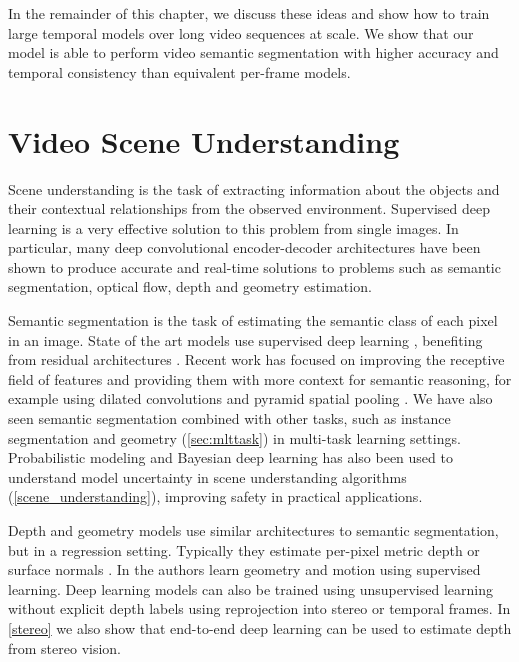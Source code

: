 In the remainder of this chapter, we discuss these ideas and show how to train large temporal models over long video sequences at scale. We show that our model is able to perform video semantic segmentation with higher accuracy and temporal consistency than equivalent per-frame models.



\section{Video Scene Understanding} 

Scene understanding is the task of extracting information about the objects and their contextual relationships from the observed environment. Supervised deep learning is a very effective solution to this problem from single images. In particular, many deep convolutional encoder-decoder architectures have been shown to produce accurate and real-time solutions to problems such as semantic segmentation, optical flow, depth and geometry estimation.

Semantic segmentation is the task of estimating the semantic class of each pixel in an image. State of the art models use supervised deep learning \citep{badrinarayanan2017segnet,long2015fully}, benefiting from residual architectures \citep{he2016deep,huang2017densely}. Recent work has focused on improving the receptive field of features and providing them with more context for semantic reasoning, for example using dilated convolutions \citep{YuKoltun2016} and pyramid spatial pooling \citep{zhao2017pspnet}. We have also seen semantic segmentation combined with other tasks, such as instance segmentation \citep{he2017maskrcnn} and geometry (\cref{sec:mlttask}) in multi-task learning settings. Probabilistic modeling and Bayesian deep learning has also been used to understand model uncertainty in scene understanding algorithms (\cref{scene_understanding}), improving safety in practical applications.

Depth and geometry models use similar architectures to semantic segmentation, but in a regression setting. Typically they estimate per-pixel metric depth or surface normals \citep{eigen2015predicting}. In \citep{UZUMIDB17} the authors learn geometry and motion using supervised learning. Deep learning models can also be trained using unsupervised learning without explicit depth labels using reprojection into stereo \citep{garg2016unsupervised} or temporal \citep{zhou2017unsupervised} frames. In \cref{stereo} we also show that end-to-end deep learning can be used to estimate depth from stereo vision.

